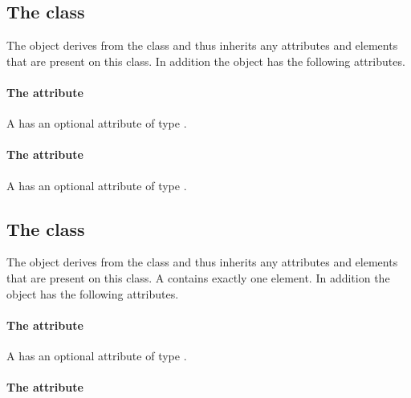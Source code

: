 \subsection{The  class}
\label{graphicalprimitivetwod-class}


The \GraphicalPrimitiveTwoD object derives from the
 class and thus inherits any attributes and
elements that are present on this class.
In addition the \GraphicalPrimitiveTwoD object has the following
attributes.

\paragraph{The \fixttspace{} attribute}

A \GraphicalPrimitiveTwoD has an optional attribute  of type
.

\paragraph{The \fixttspace{} attribute}

A \GraphicalPrimitiveTwoD has an optional attribute  of
type \FillRule.

\subsection{The  class}
\label{style-class}


The \Style object derives from the  class and thus inherits
any attributes and elements that are present on this class.
A \Style contains exactly one  element.
In addition the \Style object has the following attributes.

\paragraph{The \fixttspace{} attribute}

A \Style has an optional attribute  of type .

\paragraph{The \fixttspace{} attribute}

